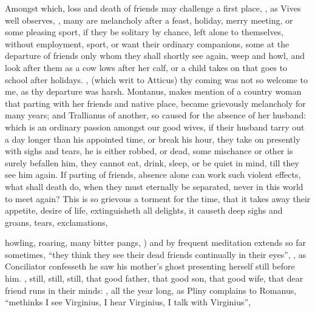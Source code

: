 Amongst which, loss and death of friends may challenge a first place, , as Vives well observes, , many are melancholy after a feast, holiday, merry
meeting, or some pleasing sport, if they be solitary by chance, left alone to
themselves, without employment, sport, or want their ordinary companions, some
at the departure of friends only whom they shall shortly see again, weep and
howl, and look after them as a cow lows after her calf, or a child takes on
that goes to school after holidays. , (which \Tully{} writ to Atticus) thy
coming was not so welcome to me, as thy departure was harsh. Montanus,
 makes mention of a country woman that
parting with her friends and native place, became grievously melancholy for
many years; and Trallianus of another, so caused for the absence of her
husband: which is an ordinary passion amongst our good wives, if their husband
tarry out a day longer than his appointed time, or break his hour, they take on
presently with sighs and tears, he is either robbed, or dead, some mischance or
other is surely befallen him, they cannot eat, drink, sleep, or be quiet in
mind, till they see him again. If parting of friends, absence alone can work
such violent effects, what shall death do, when they must eternally be
separated, never in this world to meet again? This is so grievous a torment for
the time, that it takes away their appetite, desire of life, extinguisheth all
delights, it causeth deep sighs and groans, tears, exclamations,

howling, roaring, many bitter pangs, ) and by frequent meditation
extends so far sometimes, \enquote{they think they see their dead
friends continually in their eyes}, , as Conciliator
confesseth he saw his mother's ghost presenting herself still before him.
, still, still, still, that
good father, that good son, that good wife, that dear friend runs in their
minds: , all the year long, as
Pliny complains to Romanus, \enquote{methinks I see Virginius, I
hear Virginius, I talk with Virginius}, \etc{}

